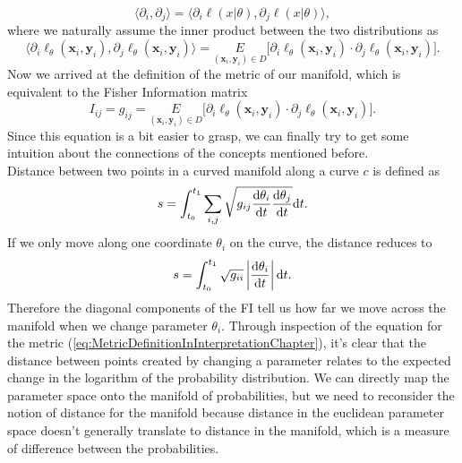 \begin{equation}
	\langle \partial_i, \partial_j \rangle = \langle \partial_i \ell(x|\theta), \partial_j \ell(x|\theta) \rangle,
\end{equation}
where we naturally assume the inner product between the two distributions as
\begin{equation}
	 \langle \partial_i \ell_\theta(\mathbf{x}_i,\mathbf{y}_i), \partial_j \ell_\theta(\mathbf{x}_i,\mathbf{y}_i) \rangle = \underset{(\mathbf{x}_i,\mathbf{y}_i)\in D}{E} \big[\partial_i \ell_\theta(\mathbf{x}_i,\mathbf{y}_i) \cdot \partial_j \ell_\theta(\mathbf{x}_i,\mathbf{y}_i)\big].
\end{equation}
Now we arrived at the definition of the metric of our manifold, which is equivalent to the Fisher Information matrix
\begin{equation}\label{eq:MetricDefinitionInInterpretationChapter}
	I_{ij} = g_{ij} = \underset{(\mathbf{x}_i,\mathbf{y}_i)\in D}{E} \big[\partial_i \ell_\theta(\mathbf{x}_i,\mathbf{y}_i) \cdot \partial_j \ell_\theta(\mathbf{x}_i,\mathbf{y}_i)\big].
\end{equation}
Since this equation is a bit easier to grasp, we can finally try to get some intuition about the connections of the concepts mentioned before.\\
Distance between two points in a curved manifold along a curve $c$ is defined as \cite{AmarisLectureNotes}
\begin{equation}
	s = \int_{t_0}^{t_1} \sum_{i,j} \sqrt{g_{ij}\frac{\mathrm{d}\theta_i}{\mathrm{d}t}\frac{\mathrm{d}\theta_j}{\mathrm{d}t}} \mathrm{d}t. 
\end{equation}
If we only move along one coordinate $\theta_i$ on the curve, the distance reduces to 
\begin{equation}
	s = \int_{t_0}^{t_1} \sqrt{g_{ii}}\left|\frac{\mathrm{d}\theta_i}{\mathrm{d}t} \right| \mathrm{d}t. 
\end{equation}
Therefore the diagonal components of the FI tell us how far we move across the manifold when we change parameter $\theta_i$. Through inspection of the equation for the metric (\cref{eq:MetricDefinitionInInterpretationChapter}), it's clear that the distance between points created by changing a parameter relates to the expected change in the logarithm of the probability distribution. We can directly map the parameter space onto the manifold of probabilities, but we need to reconsider the notion of distance for the manifold because distance in the euclidean parameter space doesn't generally translate to distance in the manifold, which is a measure of difference between the probabilities.\\

